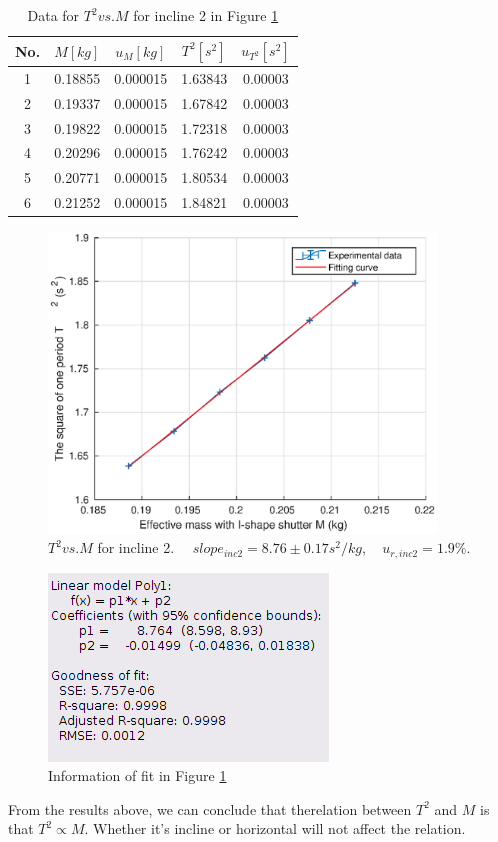     \begin{table}\small
        \centering
        \begin{tabular}{|c|c|c|c|c|}
            \hline
            No. & $M[kg]$ & $u_{M}[kg]$ & $T^2[s^2]$ & $u_{T^2}[s^2]$\\ \hline
            1 & 0.18855 & 0.000015 & 1.63843 & 0.00003\\ \hline
            2 & 0.19337 & 0.000015 & 1.67842 & 0.00003\\ \hline
            3 & 0.19822 & 0.000015 & 1.72318 & 0.00003\\ \hline
            4 & 0.20296 & 0.000015 & 1.76242 & 0.00003\\ \hline
            5 & 0.20771 & 0.000015 & 1.80534 & 0.00003\\ \hline
            6 & 0.21252 & 0.000015 & 1.84821 & 0.00003\\ \hline
        \end{tabular}
        \caption{Data for $T^2 vs. M$ for incline 2 in Figure \ref{tmi2}}\label{tmi2data}
    \end{table}

    \begin{figure}[!h]
        \centering
        \includegraphics[height=8cm]{images/tmi2.eps}
        \caption{$T^2 vs. M$ for incline 2. $\quad slope_{inc2}=8.76\pm 0.17s^2/kg,\quad u_{r,inc2}=1.9\%.$}\label{tmi2}
    \end{figure}
    \begin{figure}[h]
        \centering
        \includegraphics[height=5cm]{images/tmi2info.png}
        \caption{Information of fit in Figure \ref{tmi2}}\label{tmi2info}
    \end{figure}
    From the results above, we can conclude that therelation between $T^2$ and $M$ is that $T^2\propto M$. Whether it's incline or horizontal will not affect the relation. 

